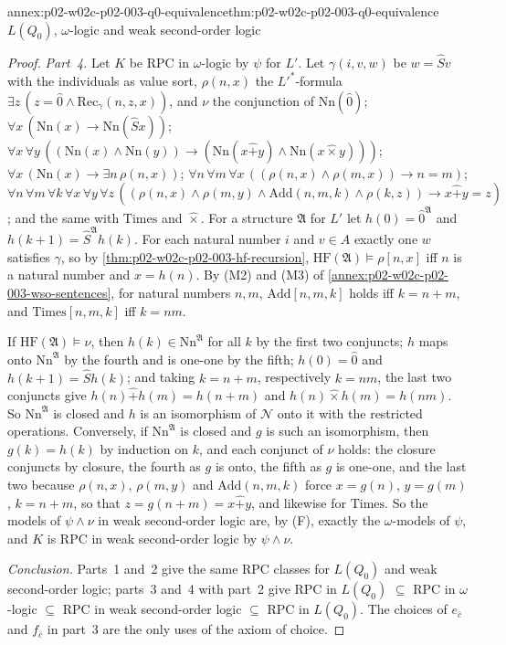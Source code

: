 \begin{annexitem}{annex:p02-w02c-p02-003-q0-equivalence}{thm:p02-w02c-p02-003-q0-equivalence}{\(L(Q_0)\), \(\omega\)-logic and weak second-order logic}
\begin{proof}
\emph{Part~4.}  Let \(K\) be RPC in \(\omega\)-logic by \(\psi\) for
\(L'\).  Let \(\gamma(i,v,w)\) be \(w=\hat Sv\) with the individuals as value
sort, \(\rho(n,x)\) the \(L'^{*}\)-formula \(\exists z\,(z=\hat0\land
\mathrm{Rec}_\gamma(n,z,x))\), and \(\nu\) the conjunction of
\(\mathrm{Nn}(\hat0)\); \(\forall x\,(\mathrm{Nn}(x)\to\mathrm{Nn}(\hat Sx))\);
\(\forall x\,\forall y\,((\mathrm{Nn}(x)\land\mathrm{Nn}(y))\to
(\mathrm{Nn}(x\mathbin{\hat+}y)\land\mathrm{Nn}(x\mathbin{\hat\times}y)))\);
\(\forall x\,(\mathrm{Nn}(x)\to\exists n\,\rho(n,x))\);
\(\forall n\,\forall m\,\forall x\,((\rho(n,x)\land\rho(m,x))\to n=m)\);
\(\forall n\,\forall m\,\forall k\,\forall x\,\forall y\,\forall z\,
((\rho(n,x)\land\rho(m,y)\land\mathrm{Add}(n,m,k)\land\rho(k,z))\to
x\mathbin{\hat+}y=z)\); and the same with \(\mathrm{Times}\) and
\(\hat\times\).  For a structure \(\mathfrak A\) for \(L'\) let
\(h(0)=\hat0^{\mathfrak A}\) and \(h(k+1)=\hat S^{\mathfrak A}h(k)\).  For
each natural number \(i\) and \(v\in A\) exactly one \(w\) satisfies
\(\gamma\), so by \cref{thm:p02-w02c-p02-003-hf-recursion},
\(\mathrm{HF}(\mathfrak A)\models\rho[n,x]\) iff \(n\) is a natural number
and \(x=h(n)\).  By (M2) and (M3) of
\cref{annex:p02-w02c-p02-003-wso-sentences}, for natural numbers \(n,m\),
\(\mathrm{Add}[n,m,k]\) holds iff \(k=n+m\), and
\(\mathrm{Times}[n,m,k]\) iff \(k=nm\).

If \(\mathrm{HF}(\mathfrak A)\models\nu\), then \(h(k)\in
\mathrm{Nn}^{\mathfrak A}\) for all \(k\) by the first two conjuncts; \(h\)
maps onto \(\mathrm{Nn}^{\mathfrak A}\) by the fourth and is one-one by the
fifth; \(h(0)=\hat0\) and \(h(k+1)=\hat S h(k)\); and taking \(k=n+m\),
respectively \(k=nm\), the last two conjuncts give
\(h(n)\mathbin{\hat+}h(m)=h(n+m)\) and \(h(n)\mathbin{\hat\times}h(m)=h(nm)\).
So \(\mathrm{Nn}^{\mathfrak A}\) is closed and \(h\) is an isomorphism of
\(\mathcal N\) onto it with the restricted operations.  Conversely, if
\(\mathrm{Nn}^{\mathfrak A}\) is closed and \(g\) is such an isomorphism,
then \(g(k)=h(k)\) by induction on \(k\), and each conjunct of \(\nu\)
holds: the closure conjuncts by closure, the fourth as \(g\) is onto, the
fifth as \(g\) is one-one, and the last two because \(\rho(n,x)\),
\(\rho(m,y)\) and \(\mathrm{Add}(n,m,k)\) force \(x=g(n)\), \(y=g(m)\),
\(k=n+m\), so that \(z=g(n+m)=x\mathbin{\hat+}y\), and likewise for
\(\mathrm{Times}\).  So the models of \(\psi\land\nu\) in weak second-order
logic are, by (F), exactly the \(\omega\)-models of \(\psi\), and \(K\) is
RPC in weak second-order logic by \(\psi\land\nu\).

\emph{Conclusion.}  Parts~1 and~2 give the same RPC classes for
\(L(Q_0)\) and weak second-order logic; parts~3 and~4 with part~2 give
RPC in \(L(Q_0)\) \(\subseteq\) RPC in \(\omega\)-logic \(\subseteq\) RPC in
weak second-order logic \(\subseteq\) RPC in \(L(Q_0)\).  The choices of
\(e_{\bar c}\) and \(f_{\bar c}\) in part~3 are the only uses of the axiom of
choice.
\end{proof}
\end{annexitem}


